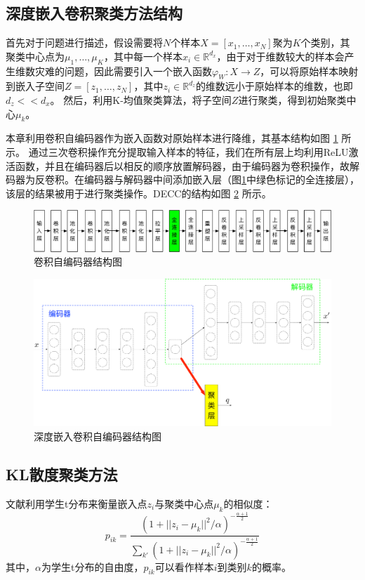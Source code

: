 \subsection{深度嵌入卷积聚类方法结构}
首先对于问题进行描述，假设需要将$N$个样本$X=[x_1,\dots,x_N]$聚为$K$个类别，其聚类中心点为$\mu_1,\dots,\mu_K$，其中每一个样本$x_i\in \mathbb{R}^{d_x}$，由于对于维数较大的样本会产生维数灾难的问题，因此需要引入一个嵌入函数$\varphi_W: X \rightarrow Z$，可以将原始样本映射到嵌入子空间$Z=[z_1,\dots,z_N]$，其中$z_i\in \mathbb{R}^{d_z}$的维数远小于原始样本的维数，也即$d_z<<d_x$。
然后，利用K-均值聚类算法，将子空间$Z$进行聚类，得到初始聚类中心${\mu_k}$。

本章利用卷积自编码器作为嵌入函数对原始样本进行降维，其基本结构如图 \ref{fig:cae} 所示。
通过三次卷积操作充分提取输入样本的特征，我们在所有层上均利用ReLU激活函数，并且在编码器后以相反的顺序放置解码器，由于编码器为卷积操作，故解码器为反卷积。在编码器与解码器中间添加嵌入层（图\ref{fig:cae}中绿色标记的全连接层），该层的结果被用于进行聚类操作。DECC的结构如图 \ref{fig:decc} 所示。
\begin{figure}[hbt]
	\centering
	\includegraphics[width=13.5cm]{figures/AE/cae}
	\caption{卷积自编码器结构图}
	\label{fig:cae}
\end{figure}

\begin{figure}[hbt]
	\centering
	\includegraphics[width=13.5cm]{figures/AE/decc}
	\caption{深度嵌入卷积自编码器结构图}
	\label{fig:decc}
\end{figure}

\subsection{KL散度聚类方法}
文献\cite{maaten2008visualizing}利用学生t分布来衡量嵌入点$z_i$与聚类中心点$\mu_k$的相似度：
\begin{equation}
	p_{ik}=\frac{(1+||z_i-\mu_k||^2/\alpha)^{-\frac{\alpha+1}{2}}}{\sum_{k'}(1+||z_i-\mu_k||^2/\alpha)^{-\frac{\alpha+1}{2}}}
	\label{equ:p}
\end{equation}
其中，$\alpha$为学生t分布的自由度，$p_{ik}$可以看作样本$i$到类别$k$的概率。

